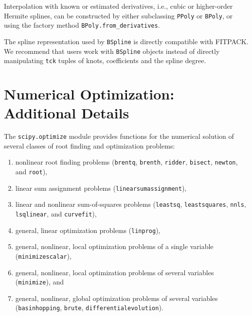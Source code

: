\documentclass[fleqn,10pt]{wlscirep}
\newcommand{\code}[1]{\texttt{#1}}
\begin{document}
Interpolation with known or estimated derivatives, i.e., cubic or
higher-order Hermite splines, can be constructed by either
subclassing \code{PPoly} or \code{BPoly}, or using the factory
method \code{BPoly.from\_derivatives}.

The spline representation used by \code{BSpline} is directly
compatible with FITPACK. We recommend that users work with
\code{BSpline} objects instead of directly manipulating \code{tck}
tuples of knots, coefficients and the spline degree.

\section*{Numerical Optimization: Additional Details}
The \texttt{scipy.optimize} module provides functions for the numerical solution of several classes of root finding and optimization problems:
\begin{enumerate}
\item nonlinear root finding problems (\texttt{brentq}, \texttt{brenth}, \texttt{ridder}, \texttt{bisect}, \texttt{newton}, and \texttt{root}),
\item linear sum assignment problems (\texttt{linear\textunderscore sum\textunderscore assignment}),
\item linear and nonlinear sum-of-squares problems (\texttt{leastsq}, \texttt{least\textunderscore squares}, \texttt{nnls}, \texttt{lsq\textunderscore linear}, and \texttt{curve\textunderscore fit}),
\item general, linear optimization problems (\texttt{linprog}),
\item general, nonlinear, local optimization problems of a single variable (\texttt{minimize\textunderscore scalar}),
\item general, nonlinear, local optimization problems of several variables (\texttt{minimize}), and
\item general, nonlinear, global optimization problems of several variables (\texttt{basinhopping}, \texttt{brute}, \texttt{differential\textunderscore evolution}).
\end{enumerate}
\end{document}
